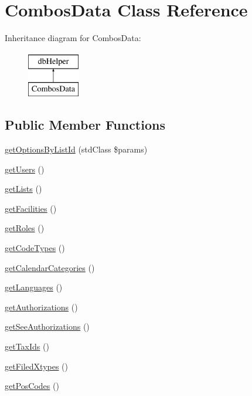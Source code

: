 \hypertarget{class_combos_data}{\section{\-Combos\-Data \-Class \-Reference}
\label{class_combos_data}
}
\-Inheritance diagram for \-Combos\-Data\-:\begin{figure}[H]
\begin{center}
\leavevmode
\includegraphics[height=2.000000cm]{class_combos_data}
\end{center}
\end{figure}
\subsection*{\-Public \-Member \-Functions}
\begin{DoxyCompactItemize}
\item 
\hyperlink{class_combos_data_ae38d22dfcd26f687b8b0e0e6632c5917}{get\-Options\-By\-List\-Id} (std\-Class \$params)
\item 
\hyperlink{class_combos_data_a0fc10b64683021b70c7eb95fb514c119}{get\-Users} ()
\item 
\hyperlink{class_combos_data_adadacf20e7598ae5f167f888b2e7aa3c}{get\-Lists} ()
\item 
\hyperlink{class_combos_data_ac4aa1fc20da22e9c21781e8687fcead5}{get\-Facilities} ()
\item 
\hyperlink{class_combos_data_aa676cae5ee8d7fb6862a8724adc2660d}{get\-Roles} ()
\item 
\hyperlink{class_combos_data_af1b9ff2a0f6b445bf3150edfe7e13461}{get\-Code\-Types} ()
\item 
\hyperlink{class_combos_data_a6c113ad96ca8b54ec0167ecccf5f0b2c}{get\-Calendar\-Categories} ()
\item 
\hyperlink{class_combos_data_ada2ef7bac2979b90332fe9a527c60667}{get\-Languages} ()
\item 
\hyperlink{class_combos_data_a1cc9d4b90af3fd2d18449a607edb2c20}{get\-Authorizations} ()
\item 
\hyperlink{class_combos_data_a4a35941773d1bc2ee98811721fc7c20c}{get\-See\-Authorizations} ()
\item 
\hyperlink{class_combos_data_a20eee2f861c3bd5923aa5340eea44cb6}{get\-Tax\-Ids} ()
\item 
\hyperlink{class_combos_data_afda093a8a98909d5c22ddf2bef3a347b}{get\-Filed\-Xtypes} ()
\item 
\hyperlink{class_combos_data_a050b23f05f60bfd5722dd80a844c4a1f}{get\-Pos\-Codes} ()
\end{DoxyCompactItemize}


